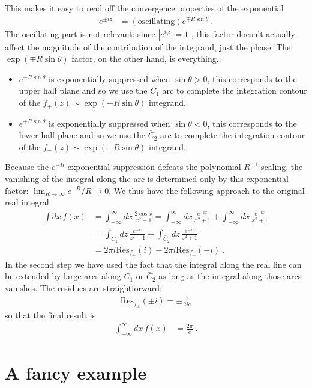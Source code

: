 \documentclass[
  11pt,
	colorful,
	raggedright,
]{tufte-style-thesis-flip}
\begin{document}
This makes it easy to read off the convergence properties of the exponential
\begin{align}
  e^{\pm iz} &= (\text{oscillating})e^{\mp R\sin\theta} \ .
\end{align}
The oscillating part is not relevant: since $|e^{i\varphi}| = 1$ , this factor doesn't actually affect the magnitude of the contribution of the integrand, just the phase. The $\exp(\mp R\sin\theta)$ factor, on the other hand, is everything. 
\begin{itemize}
  \item $e^{- R\sin\theta}$ is exponentially suppressed when $\sin\theta > 0$, this corresponds to the upper half plane and so we use the $C_1$ arc to complete the integration contour of the $f_+(z)\sim \exp(-R\sin\theta)$ integrand.
  \item $e^{+ R\sin\theta}$ is exponentially suppressed when $\sin\theta < 0$, this corresponds to the lower half plane and so we use the $\bar C_2$ arc to complete the integration contour of the $f_-(z)\sim \exp(+R\sin\theta)$ integrand.
\end{itemize}
Because the $e^{-R}$ exponential suppression defeats the polynomial $R^{-1}$ scaling, the vanishing of the integral along the arc is determined only by this exponential factor: $\lim_{R\to\infty}e^{-R}/R\to 0$. We thus have the following approach to the original real integral:
\begin{align}
  \int dx\, f(x) &= \int_{-\infty}^\infty  dx\,
\frac{2\cos x}{x^2+1} 
  = 
  \int_{-\infty}^\infty  dx\,
  \frac{e^{+ix}}{x^2+1} 
  +
  \int_{-\infty}^\infty  dx\,
  \frac{e^{-ix}}{x^2+1} 
  \\ 
  &=
  \int_{C_1} dz\, 
  \frac{e^{+iz}}{z^2+1} 
  +
  \int_{\bar C_2} dz\, 
  \frac{e^{-iz}}{z^2+1} 
  \\
  &=
  2\pi i \text{Res}_{f_+}(i)
  -
  2\pi i \text{Res}_{f_-}(-i)
\ .
\end{align}
In the second step we have used the fact that the integral along the real line can be extended by large arcs along $C_1$ or $\bar C_2$ as long as the integral along those arcs vanishes. The residues are straightforward: 
\begin{align}
  \text{Res}_{f_\pm}(\pm i) = \pm \frac{1}{2ie}
\end{align}
so that the final result is
\begin{align}
  \int_{-\infty}^\infty dx\, f(x) &= \frac{2\pi}{e} \ .
\end{align}

\section{A fancy example}
\end{document}
